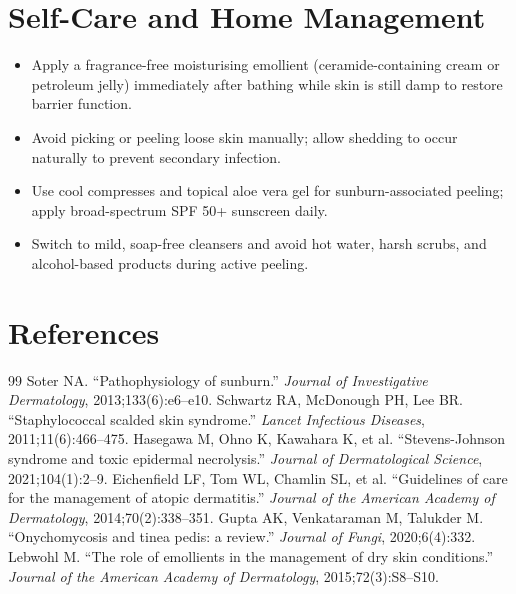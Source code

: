 \section*{Self-Care and Home Management}
\begin{itemize}
  \item Apply a fragrance-free moisturising emollient (ceramide-containing cream or petroleum jelly) immediately after bathing while skin is still damp to restore barrier function.
  \item Avoid picking or peeling loose skin manually; allow shedding to occur naturally to prevent secondary infection.
  \item Use cool compresses and topical aloe vera gel for sunburn-associated peeling; apply broad-spectrum SPF 50+ sunscreen daily.
  \item Switch to mild, soap-free cleansers and avoid hot water, harsh scrubs, and alcohol-based products during active peeling.
\end{itemize}

\section*{References}
\begin{thebibliography}{99}
 Soter NA. ``Pathophysiology of sunburn.'' \textit{Journal of Investigative Dermatology}, 2013;133(6):e6--e10.
 Schwartz RA, McDonough PH, Lee BR. ``Staphylococcal scalded skin syndrome.'' \textit{Lancet Infectious Diseases}, 2011;11(6):466--475.
 Hasegawa M, Ohno K, Kawahara K, et al. ``Stevens-Johnson syndrome and toxic epidermal necrolysis.'' \textit{Journal of Dermatological Science}, 2021;104(1):2--9.
 Eichenfield LF, Tom WL, Chamlin SL, et al. ``Guidelines of care for the management of atopic dermatitis.'' \textit{Journal of the American Academy of Dermatology}, 2014;70(2):338--351.
 Gupta AK, Venkataraman M, Talukder M. ``Onychomycosis and tinea pedis: a review.'' \textit{Journal of Fungi}, 2020;6(4):332.
 Lebwohl M. ``The role of emollients in the management of dry skin conditions.'' \textit{Journal of the American Academy of Dermatology}, 2015;72(3):S8--S10.

\end{thebibliography}

